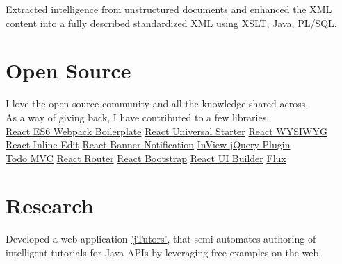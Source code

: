 \documentclass[]{my-resume-openfont}
\begin{document}
\begin{minipage}[t]{0.66\textwidth}
\begin{tightemize}
\item Extracted intelligence from unstructured documents and enhanced the XML content into a fully described standardized XML using XSLT, Java, PL/SQL.
\end{tightemize}


\section{Open Source}
I love the open source community and all the knowledge shared across. \\
As a way of giving back, I have contributed to a few libraries. \\
\sectionsep
{}
\href{https://github.com/vasanthk/react-es6-webpack-boilerplate}{React ES6 Webpack Boilerplate} \textbullet{} \href{https://github.com/vasanthk/react-universal-starter}{React Universal Starter}
\textbullet{} \href{https://github.com/bmcmahen/react-wysiwyg}{React WYSIWYG} \\
\href{https://github.com/vasanthk/react-inline-edit}{React Inline Edit} \textbullet{} \href{https://github.com/vasanthk/react-banner-notification}{React Banner Notification}
\textbullet{} \href{https://github.com/vasanthk/InView-jQuery-Plugin}{InView jQuery Plugin} \\
\href{https://github.com/tastejs/todomvc}{Todo MVC} \textbullet{} \href{https://github.com/rackt/react-router}{React Router} \textbullet{} \href{https://github.com/react-bootstrap/react-bootstrap}{React Bootstrap}
\textbullet{} \href{https://github.com/ipselon/react-ui-builder}{React UI Builder} \textbullet{} \href{https://github.com/facebook/flux}{Flux} \\
\sectionsep


\section{Research}
Developed a web application \href{http://ir.library.oregonstate.edu/xmlui/handle/1957/30097}{'jTutors'}, that semi-automates authoring of intelligent tutorials for Java APIs by leveraging free examples on the web.
\sectionsep


\end{minipage}
\end{document}
